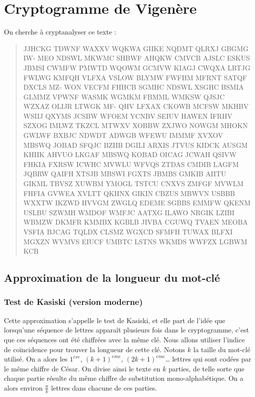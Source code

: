 \documentclass[a4paper, titlepage]{livret}
\begin{document}
\section{Cryptogramme de Vigenère}

On cherche à cryptanalyser ce texte :
\begin{center}
\begin{quote}
\og JJHCKG TDWNF WAXXV WQKWA GIIKE NQDMT QLRXJ GBGMG IW-
MEO NDSWL MKWMC SHBWF AHQKW CMVCB AJSLC ESKUS JBMSI
CWMFW PMWTD WQOWM GCMVW KIAGJ CWQXA LRTJG FWLWG
KMFQH VLFXA VSLOW BLYMW FWFHM MFRNT SATQF DXCLS MZ-
WON VECFM FHHCB SGMHC NDSWL XSGHC BSMIA GLMMZ VPWNF
WASMK WGMKM FBMML WMKSW QJSJC WZXAZ OLIJR LTWGK MF-
QHV LFXAX CKOWB MCFSW MKHBV WSIIJ QXYMS JCSBW WFOEM
YCNBV SEIUV HAWEN IFRHV SZXOG IMLWZ TKZCL MTWXV XOBBW
ZXJWO NOWGM MHOKN GWLWF BXBJC NDWDT ADWGB WFEWU
IMMMF XVXOV MBSWQ JOBAD SFQJC BZIIB DGILI ARXIS JTVUS KIDCK
AUSGM KHIIK AHVUO LKGAF MBSWQ KOBAD OICAG JCWAH QSIVW
FHKIA FXRSW ICWHC MVWLU WFVQS ZTDAS CMDIB LAGFM JQBRW
QAIFH XTSJB MBSWI FGXTS JBMBS GMKIB AIITU GIKML TBVSZ XUWBM
YMOGL TSTCU CNXVS ZMFGF MVWLM FHFIA GVWEA XVLTT QKHNX
GIKIN CBZUS MBWVN USBBB WXXTW IKZWD HVVGM ZWGLQ EDEME
SGBBS EMMFW QKENM USLBU SZWMH WMDOF WMFJC AATXG ILAWO
NRGIK LZIBI WBMZW DKMFR KMMBX KGBLB JIVBA CGUWQ TVAEN
MEOBA VSFIA BJCAG TQLDX CLSMZ WGXCD SFMFH TUWAX BLFXI
MGXZN WVMVS EIUCF UMBTC LSTNS WKMDS WWFZX LGBWM KCB \fg{}
\end{quote}
\end{center}

\subsection{Approximation de la longueur du mot-clé}
\subsubsection{Test de Kasiski (version moderne)}
Cette approximation s'appelle le test de Kasiski, et elle part de l'idée que lorsqu'une séquence de lettres apparaît plusieurs fois dans le cryptogramme, c'est que ces séquences ont été chiffrées avec la même clé.
Nous allons utiliser l'indice de coïncidence pour trouver la longueur de cette clé.
Notons $k$ la taille du mot-clé utilisé.
On a alors les $1^{ere}$, $(k+1)^{eme}$, $(2k+1)^{eme}$… lettres qui sont codées par le même chiffre de César.
On divise ainsi le texte en $k$ parties, de telle sorte que chaque partie résulte du même chiffre de substitution mono-alphabétique.
On a alors environ $\frac{n}{k}$ lettres dans chacune de ces parties.
\end{document}
